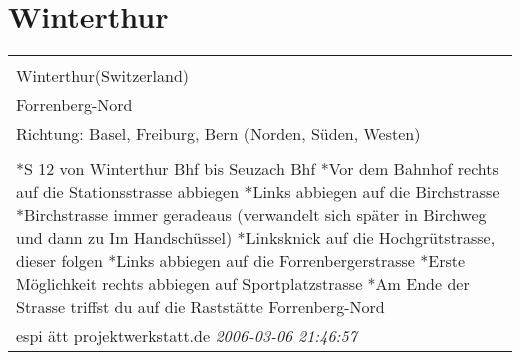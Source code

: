 \documentclass[a4paper,12pt]{article}
\begin{document}
\section{Winterthur}
\begin{tabular}{|p{13cm}|}
\hline\\
Winterthur(Switzerland)\\
Forrenberg-Nord\\
Richtung: Basel, Freiburg, Bern (Norden, Süden, Westen) \\
\hline\\
*S 12 von Winterthur Bhf bis Seuzach Bhf
*Vor dem Bahnhof rechts auf die Stationsstrasse abbiegen
*Links abbiegen auf die Birchstrasse
*Birchstrasse immer geradeaus (verwandelt sich später in Birchweg und dann zu Im Handschüssel)
*Linksknick auf die Hochgrütstrasse, dieser folgen
*Links abbiegen auf die Forrenbergerstrasse
*Erste Möglichkeit rechts abbiegen auf Sportplatzstrasse
*Am Ende der Strasse triffst du auf die Raststätte Forrenberg-Nord \\
espi ätt projektwerkstatt.de \textit{ 2006-03-06 21:46:57 }\\\hline
\end{tabular}
\end{document}

